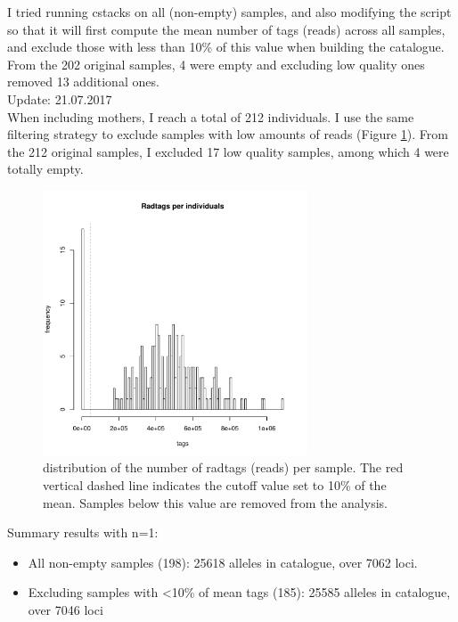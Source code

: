 \documentclass[10pt,a4paper]{report}
\begin{document}
I tried running cstacks on all (non-empty) samples, and also modifying the script so that it will first compute the mean number of tags (reads) across all samples, and exclude those with less than 10\% of this value when building the catalogue. From the 202 original samples, 4 were empty and excluding low quality ones removed 13 additional ones.\\

Update: 21.07.2017\\
When including mothers, I reach a total of 212 individuals. I use the same filtering strategy to exclude samples with low amounts of reads (Figure \ref{tags_dist}). From the 212 original samples, I excluded 17 low quality samples, among which 4 were totally empty.

\begin{figure}[h]
	\begin{center}
		\includegraphics[width=0.7\textwidth]{stacks_pipeline/radtags_distrib.pdf}
		\caption{distribution of the number of radtags (reads) per sample. The red vertical dashed line indicates the cutoff value set to 10\% of the mean. Samples below this value are removed from the analysis.}
		\label{tags_dist}
	\end{center}
\end{figure}
\FloatBarrier
Summary results with n=1:
\begin{itemize}
\item All non-empty samples (198): 25618 alleles in catalogue, over 7062 loci.
\item Excluding samples with \textless 10\% of mean tags (185): 25585 alleles in catalogue, over 7046 loci
\end{itemize}
\end{document}
